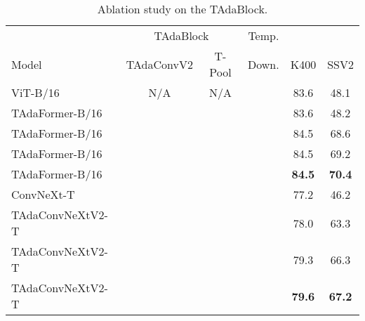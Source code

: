 \documentclass[10pt,journal,compsoc]{IEEEtran}
\newcommand{\vb}{{\color{vit}{\,}}}
\newcommand{\cb}{{\color{convnet}{\,}}}
\newcommand{\cmark}{\color{good}\ding{51}}\newcommand{\xmark}{\color{bad}\ding{55}}
\newcommand{\tablestyle}[2]{\setlength{\tabcolsep}{#1}\renewcommand{\arraystretch}{#2}\centering\small}
\newcommand\graycell[0]{\cellcolor{midgrey}}
\begin{document}
\begin{table}[t]
\caption{Ablation study on the TAdaBlock.}
\centering
\vspace{-3mm}
\tablestyle{2pt}{1.0}
\begin{tabular}{lccccc}
\toprule
~ & \multicolumn{2}{c}{\footnotesize{TAdaBlock}}& \footnotesize Temp. & ~ & ~ \\
\cline{2-3}
\footnotesize Model & \scriptsize TAdaConvV2 & \scriptsize T-Pool & \footnotesize Down. & \footnotesize K400 & \footnotesize SSV2 \\
\midrule
\vb \footnotesize{ViT-B/16} & \scriptsize N/A & \scriptsize N/A & \xmark & 83.6 & 48.1 \\
\vb\footnotesize{TAdaFormer-B/16} & \xmark & \xmark & \xmark & 83.6 & 48.2 \\
\vb\footnotesize{TAdaFormer-B/16} & \cmark & \xmark & \xmark & 84.5 & 68.6 \\
\vb\footnotesize{TAdaFormer-B/16} & \cmark & \cmark & \xmark & 84.5 & 69.2 \\
\vb\footnotesize{TAdaFormer-B/16} & \cmark & \cmark & \cmark & \graycell \bf 84.5 & \graycell \bf 70.4 \\
\midrule
\cb\footnotesize{ConvNeXt-T} & \xmark & \xmark & \xmark & 77.2 & 46.2 \\
\cb\footnotesize{TAdaConvNeXtV2-T} & \cmark & \xmark & \xmark & 78.0 & 63.3 \\
\cb\footnotesize{TAdaConvNeXtV2-T} & \cmark & \cmark & \xmark & 79.3 & 66.3\\
\cb\footnotesize{TAdaConvNeXtV2-T} & \cmark & \cmark & \cmark & \graycell \bf79.6 & \graycell \bf67.2 \\ 
\bottomrule
\end{tabular}
\label{tab:ablation-tadablocks}
\end{table}
\end{document}
